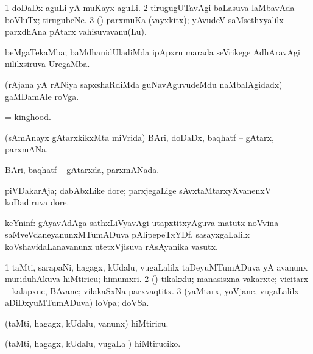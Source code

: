 \bentry
{}
\gl{\nA}
\bmng
\bnum
\num{1} doDaDx aguLi yA muKayx aguLi. 
\num{2} tirugugUTavAgi baLasuva laMbavAda boVluTx; tirugubeNe. 
\num{3} (\rUpa) parxmuKa (vayxkitx); yAvudeV saMsethxyalilx parxdhAna pAtarx vahisuvavanu(Lu). 
\enum
\emng
\eentry

\bentry
{}
\gl{\nA}
\bmng
beMgaTekaMba; baMdhanidUladiMda ipApxru marada seVrikege AdhAravAgi nililxsiruva UregaMba.  
\emng
\eentry

\bentry
{}
\gl{\nA}
\bmng
(rAjana yA rANiya sapxshaRdiMda guNavAguvudeMdu naMbalAgidadx) gaMDamAle roVga. 
\emng
\eentry

\bentry
{}
\gl{\nA}
\bmng
 = \hyperlink{kinghood}{kinghood}. 
\emng
\eentry

\bentry
{}
\gl{\nA}
\bmng
(sAmAnayx gAtarxkikxMta miVrida) BAri, doDaDx, baqhatf -- gAtarx, parxmANa. 
\emng
\eentry

\bentry
{}
\gl{\gu}
\bmng
BAri, baqhatf -- gAtarxda, parxmANada. 
\emng
\eentry

\bentry
{}
\gl{\nA}
\bmng
piVDakarAja; dabAbxLike dore; parxjegaLige sAvxtaMtarxyXvanenxV koDadiruva dore. 
\emng
\eentry

\bentry
{}
\gl{\nA}
\bmng
keYninf: 
\banum
{} gAyavAdAga sathxLiVyavAgi utapxtitxyAguva matutx noVvina saMveVdaneyanunxMTumADuva pAlipepeTxYDf. 
 sasayxgaLalilx koVshavidaLanavanunx utetxVjisuva rAsAyanika vasutx. 
\eanum
\emng
\eentry

\bentry
{}
\gl{\nA}
\bmng
\bnum
\num{1} taMti, sarapaNi, hagagx, kUdalu, \mo vugaLalilx taDeyuMTumADuva yA avanunx muriduhAkuva hiMtiricu; himumxri.  
\num{2} (\rUpa) tikakxlu; manasisxna vakarxte; vicitarx -- kalapxne, BAvane; vilakaSxNa parxvaqtitx. 
\num{3} (yaMtarx, yoVjane, \mo vugaLalilx aDiDxyuMTumADuva) loVpa; doVSa. 
\enum
\emng
\eentry

\bentry
{}
\gl{\sakirx}
\bmng
(taMti, hagagx, kUdalu, \mo vanunx) hiMtiricu. 
\emng

\noindent
\gl{\akirx}
\bmng
(taMti, hagagx, kUdalu, \mo vugaLa \vi) hiMtiruciko. 
\emng
\eentry


